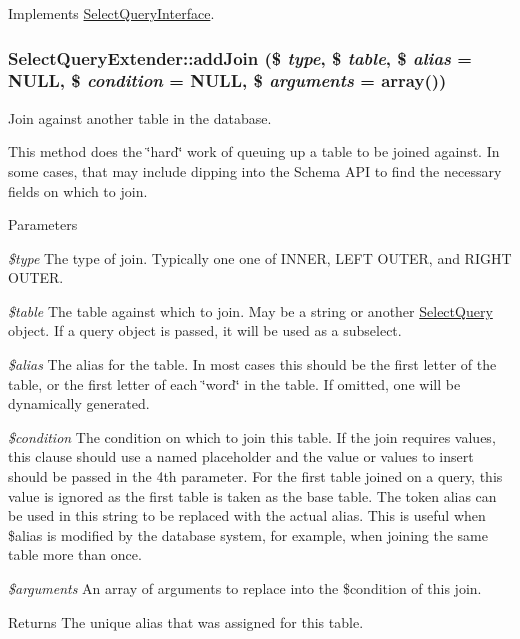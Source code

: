 Implements \hyperlink{interfaceSelectQueryInterface_a1c8331825723867ceba20436a6ea5ed1}{SelectQueryInterface}.\hypertarget{classSelectQueryExtender_ad6b6dd29f9c4de6129030be8d110d6ee}{
\subsubsection[{addJoin}]{\setlength{\rightskip}{0pt plus 5cm}SelectQueryExtender::addJoin (\$ {\em type}, \/  \$ {\em table}, \/  \$ {\em alias} = {\ttfamily NULL}, \/  \$ {\em condition} = {\ttfamily NULL}, \/  \$ {\em arguments} = {\ttfamily array()})}}
\label{classSelectQueryExtender_ad6b6dd29f9c4de6129030be8d110d6ee}
Join against another table in the database.

This method does the \char`\"{}hard\char`\"{} work of queuing up a table to be joined against. In some cases, that may include dipping into the Schema API to find the necessary fields on which to join.


\begin{DoxyParams}{Parameters}
\item[{\em \$type}]The type of join. Typically one one of INNER, LEFT OUTER, and RIGHT OUTER. \item[{\em \$table}]The table against which to join. May be a string or another \hyperlink{classSelectQuery}{SelectQuery} object. If a query object is passed, it will be used as a subselect. \item[{\em \$alias}]The alias for the table. In most cases this should be the first letter of the table, or the first letter of each \char`\"{}word\char`\"{} in the table. If omitted, one will be dynamically generated. \item[{\em \$condition}]The condition on which to join this table. If the join requires values, this clause should use a named placeholder and the value or values to insert should be passed in the 4th parameter. For the first table joined on a query, this value is ignored as the first table is taken as the base table. The token alias can be used in this string to be replaced with the actual alias. This is useful when \$alias is modified by the database system, for example, when joining the same table more than once. \item[{\em \$arguments}]An array of arguments to replace into the \$condition of this join. \end{DoxyParams}
\begin{DoxyReturn}{Returns}
The unique alias that was assigned for this table. 
\end{DoxyReturn}


